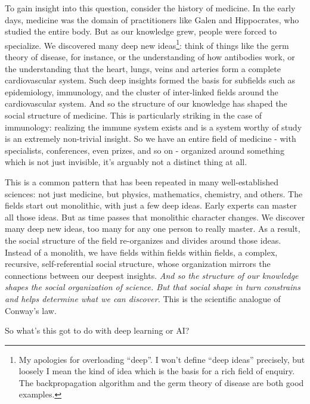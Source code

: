 \documentclass[a4paper,twoside,10pt]{book}
\begin{document}
To gain insight into this question, consider the history of medicine. In the early days, medicine was the domain of practitioners like Galen and Hippocrates, who studied the entire body. But as our knowledge grew, people were forced to specialize. We discovered many deep new ideas\footnote{My apologies for overloading ``deep''. I won't define ``deep ideas'' precisely, but loosely I mean the kind of idea which is the basis for a rich field of enquiry. The backpropagation algorithm and the germ theory of disease are both good examples.}: think of things like the germ theory of disease, for instance, or the understanding of how antibodies work, or the understanding that the heart, lungs, veins and arteries form a complete cardiovascular system. Such deep insights formed the basis for subfields such as epidemiology, immunology, and the cluster of inter-linked fields around the cardiovascular system. And so the structure of our knowledge has shaped the social structure of medicine. This is particularly striking in the case of immunology: realizing the immune system exists and is a system worthy of study is an extremely non-trivial insight. So we have an entire field of medicine - with specialists, conferences, even prizes, and so on - organized around something which is not just invisible, it's arguably not a distinct thing at all.

This is a common pattern that has been repeated in many well-established sciences: not just medicine, but physics, mathematics, chemistry, and others. The fields start out monolithic, with just a few deep ideas. Early experts can master all those ideas. But as time passes that monolithic character changes. We discover many deep new ideas, too many for any one person to really master. As a result, the social structure of the field re-organizes and divides around those ideas. Instead of a monolith, we have fields within fields within fields, a complex, recursive, self-referential social structure, whose organization mirrors the connections between our deepest insights. \textit{And so the structure of our knowledge shapes the social organization of science. But that social shape in turn constrains and helps determine what we can discover.} This is the scientific analogue of Conway's law.

So what's this got to do with deep learning or AI?
\end{document}
